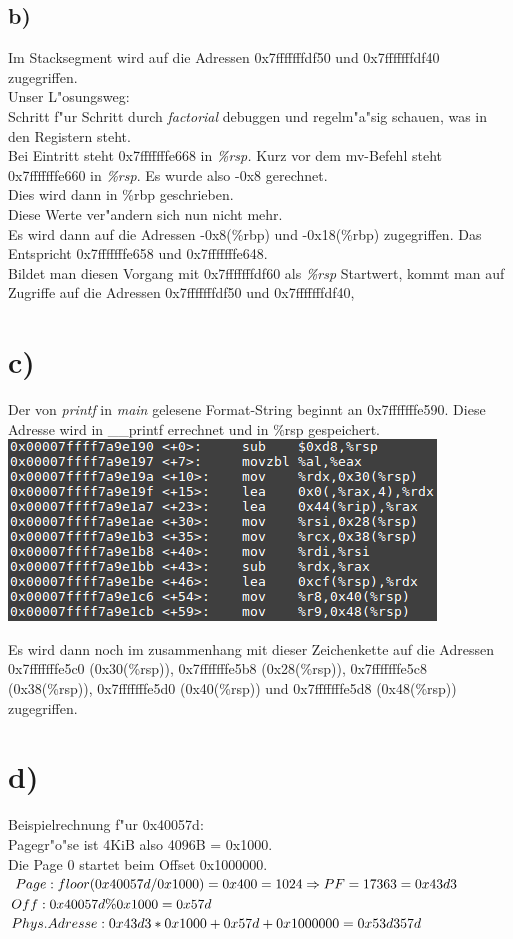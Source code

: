 \documentclass{ti2}
\begin{document}
\subsection*{b)}
Im Stacksegment wird auf die Adressen 0x7fffffffdf50 und 0x7fffffffdf40 zugegriffen.\\

Unser L"osungsweg:\\
Schritt f"ur Schritt durch \emph{factorial} debuggen und regelm"a"sig schauen, was in den Registern steht.\\
Bei Eintritt steht 0x7fffffffe668 in \emph{\%rsp.} 
Kurz vor dem mv-Befehl steht 0x7fffffffe660 in \emph{\%rsp}. Es wurde also -0x8 gerechnet.\\
Dies wird dann in \%rbp geschrieben.\\
Diese Werte ver"andern sich nun nicht mehr.\\
Es wird dann auf die Adressen -0x8(\%rbp) und -0x18(\%rbp) zugegriffen.
Das Entspricht 0x7fffffffe658 und 0x7fffffffe648.\\


Bildet man diesen Vorgang mit 0x7fffffffdf60 als \emph{\%rsp} Startwert, kommt man auf Zugriffe auf die Adressen 0x7fffffffdf50 und 0x7fffffffdf40,\\
\section*{c)}
Der von \emph{printf} in \emph{main} gelesene Format-String beginnt an 0x7fffffffe590. Diese Adresse wird in \_\_printf errechnet und in \%rsp gespeichert.\\
\includegraphics{aufgabe01/a1.png}

Es wird dann noch im zusammenhang mit dieser Zeichenkette auf die Adressen
0x7fffffffe5c0 (0x30(\%rsp)), 0x7fffffffe5b8 (0x28(\%rsp)), 0x7fffffffe5c8 (0x38(\%rsp)), 0x7fffffffe5d0 (0x40(\%rsp)) und 0x7fffffffe5d8 (0x48(\%rsp)) zugegriffen.  
 
\section*{d)}
Beispielrechnung f"ur 0x40057d:\\
Pagegr"o"se ist 4KiB also 4096B = 0x1000.\\
Die Page 0 startet beim Offset 0x1000000.\\
$Page: floor(0x40057d/0x1000) = 0x400 = 1024 \Rightarrow PF = 17363 = 0x43d3\\$
$Off: 0x40057d \% 0x1000 = 0x57d\\$
$Phys.Adresse: 0x43d3 * 0x1000 + 0x57d + 0x1000000 = 0x53d357d \\$ 
\end{document}
